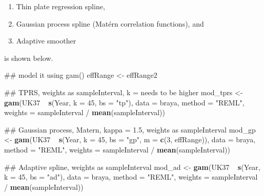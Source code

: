 \documentclass[12pt,]{article}
\newenvironment{Shaded}{\begin{snugshade}}{\end{snugshade}}
\newcommand{\KeywordTok}[1]{\textcolor[rgb]{0.13,0.29,0.53}{\textbf{{#1}}}}
\newcommand{\DataTypeTok}[1]{\textcolor[rgb]{0.13,0.29,0.53}{{#1}}}
\newcommand{\DecValTok}[1]{\textcolor[rgb]{0.00,0.00,0.81}{{#1}}}
\newcommand{\StringTok}[1]{\textcolor[rgb]{0.31,0.60,0.02}{{#1}}}
\newcommand{\NormalTok}[1]{{#1}}
\providecommand{\tightlist}{%
  \setlength{\itemsep}{0pt}\setlength{\parskip}{0pt}}
\begin{document}
\begin{enumerate}
\def\labelenumi{\arabic{enumi}.}
\tightlist
\item
  Thin plate regression spline,
\item
  Gaussian process spline (Matérn correlation functions), and
\item
  Adaptive smoother
\end{enumerate}

is shown below.

\begin{Shaded}
\begin{Highlighting}[]
\NormalTok{## model it using gam()}
\NormalTok{effRange <-}\StringTok{ }\NormalTok{effRange2}

\NormalTok{## TPRS, weights as sampleInterval, k = needs to be higher}
\NormalTok{mod_tprs <-}\StringTok{ }\KeywordTok{gam}\NormalTok{(UK37 ~}\StringTok{ }\KeywordTok{s}\NormalTok{(Year, }\DataTypeTok{k =} \DecValTok{45}\NormalTok{, }\DataTypeTok{bs =} \StringTok{"tp"}\NormalTok{), }\DataTypeTok{data =} \NormalTok{braya,}
                \DataTypeTok{method =} \StringTok{"REML"}\NormalTok{,}
                \DataTypeTok{weights =} \NormalTok{sampleInterval /}\StringTok{ }\KeywordTok{mean}\NormalTok{(sampleInterval))}

\NormalTok{## Gaussian process, Matern, kappa = 1.5, weights as sampleInterval}
\NormalTok{mod_gp <-}\StringTok{ }\KeywordTok{gam}\NormalTok{(UK37 ~}\StringTok{ }\KeywordTok{s}\NormalTok{(Year, }\DataTypeTok{k =} \DecValTok{45}\NormalTok{, }\DataTypeTok{bs =} \StringTok{"gp"}\NormalTok{, }\DataTypeTok{m =} \KeywordTok{c}\NormalTok{(}\DecValTok{3}\NormalTok{, effRange)),}
              \DataTypeTok{data =} \NormalTok{braya,}
              \DataTypeTok{method =} \StringTok{"REML"}\NormalTok{,}
              \DataTypeTok{weights =} \NormalTok{sampleInterval /}\StringTok{ }\KeywordTok{mean}\NormalTok{(sampleInterval))}

\NormalTok{## Adaptive spline, weights as sampleInterval}
\NormalTok{mod_ad <-}\StringTok{ }\KeywordTok{gam}\NormalTok{(UK37 ~}\StringTok{ }\KeywordTok{s}\NormalTok{(Year, }\DataTypeTok{k =} \DecValTok{45}\NormalTok{, }\DataTypeTok{bs =} \StringTok{"ad"}\NormalTok{), }\DataTypeTok{data =} \NormalTok{braya,}
              \DataTypeTok{method =} \StringTok{"REML"}\NormalTok{,}
              \DataTypeTok{weights =} \NormalTok{sampleInterval /}\StringTok{ }\KeywordTok{mean}\NormalTok{(sampleInterval))}
\end{Highlighting}
\end{Shaded}
\end{document}
